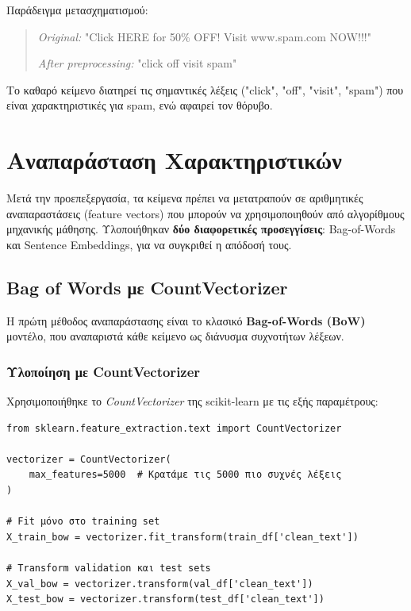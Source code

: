 \documentclass[12pt,a4paper,twoside]{book}
\begin{document}
Παράδειγμα μετασχηματισμού:

\begin{quote}
    \textit{Original:} "Click HERE for 50\% OFF! Visit www.spam.com NOW!!!"

    \textit{After preprocessing:} "click off visit spam"
\end{quote}

Το καθαρό κείμενο διατηρεί τις σημαντικές λέξεις ("click", "off", "visit", "spam") που είναι χαρακτηριστικές για spam, ενώ αφαιρεί τον θόρυβο.

\section{Αναπαράσταση Χαρακτηριστικών}

Μετά την προεπεξεργασία, τα κείμενα πρέπει να μετατραπούν σε αριθμητικές αναπαραστάσεις (feature vectors) που μπορούν να χρησιμοποιηθούν από αλγορίθμους μηχανικής μάθησης. Υλοποιήθηκαν \textbf{δύο διαφορετικές προσεγγίσεις}: Bag-of-Words και Sentence Embeddings, για να συγκριθεί η απόδοσή τους.

\subsection{Bag of Words με CountVectorizer}

Η πρώτη μέθοδος αναπαράστασης είναι το κλασικό \textbf{Bag-of-Words (BoW)} μοντέλο, που αναπαριστά κάθε κείμενο ως διάνυσμα συχνοτήτων λέξεων.

\subsubsection*{Υλοποίηση με CountVectorizer}

Χρησιμοποιήθηκε το \textit{CountVectorizer} της scikit-learn με τις εξής παραμέτρους:

\begin{tcolorbox}[myCustomStyle={CountVectorizer Configuration}]
    \begin{lstlisting}[style=myPythonStyle]
from sklearn.feature_extraction.text import CountVectorizer

vectorizer = CountVectorizer(
    max_features=5000  # Κρατάμε τις 5000 πιο συχνές λέξεις
)

# Fit μόνο στο training set
X_train_bow = vectorizer.fit_transform(train_df['clean_text'])

# Transform validation και test sets
X_val_bow = vectorizer.transform(val_df['clean_text'])
X_test_bow = vectorizer.transform(test_df['clean_text'])
\end{lstlisting}
\end{tcolorbox}
\end{document}
